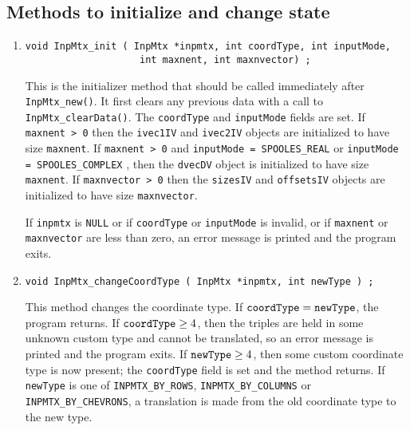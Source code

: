 \subsection{Methods to initialize and change state}
\label{subsection:InpMtx:proto:initializers}
\par
\begin{enumerate}
\item
\begin{verbatim}
void InpMtx_init ( InpMtx *inpmtx, int coordType, int inputMode, 
                    int maxnent, int maxnvector) ;
\end{verbatim}
This is the initializer method that should be called immediately
after {\tt InpMtx\_new()}.
It first clears any previous data with a call to 
{\tt InpMtx\_clearData()}.
The {\tt coordType} and {\tt inputMode} fields are set.
If {\tt maxnent > 0} then the {\tt ivec1IV} and {\tt ivec2IV} 
objects are initialized to have size {\tt maxnent}.
If {\tt maxnent > 0} 
and {\tt inputMode = SPOOLES\_REAL} 
or {\tt inputMode = SPOOLES\_COMPLEX} ,
then the {\tt dvecDV} object is initialized to have size {\tt maxnent}.
If {\tt maxnvector > 0} then the {\tt sizesIV} and {\tt offsetsIV} 
objects are initialized to have size {\tt maxnvector}.
\par {}
If {\tt inpmtx} is {\tt NULL} 
or if {\tt coordType} or {\tt inputMode} is invalid,
or if {\tt maxnent} or {\tt maxnvector} are less than zero,
an error message is printed and the program exits.
\item
\begin{verbatim}
void InpMtx_changeCoordType ( InpMtx *inpmtx, int newType ) ;
\end{verbatim}
This method changes the coordinate type.
If ${\tt coordType} = {\tt newType}$, the program returns.
If ${\tt coordType} \ge 4$, then the triples are held in some unknown
custom type and cannot be translated, so an error message is
printed and the program exits.
If ${\tt newType} \ge 4$, then some custom coordinate type is now
present; the {\tt coordType} field is set and the method returns.
If {\tt newType} is one of {\tt INPMTX\_BY\_ROWS},
{\tt INPMTX\_BY\_COLUMNS} or {\tt INPMTX\_BY\_CHEVRONS},
a translation is made from the old coordinate type to the new type.

\end{enumerate}
